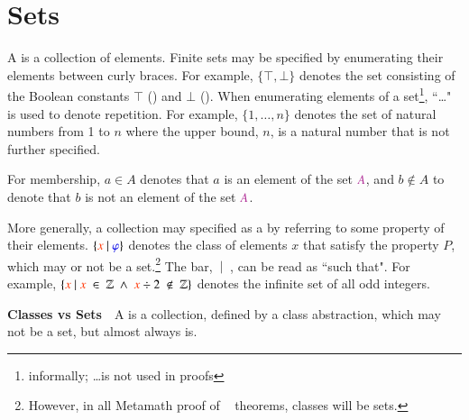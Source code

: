 
%

\section{Sets}\label{sec:sets}

\pn A  is a collection of elements.  Finite sets may be specified by enumerating their elements between curly braces.  For example, \(\{\top, \bot\}\) denotes the set consisting of the Boolean constants $\top$ () and $\bot$ ().  When enumerating elements of a set\footnote{informally; \ldots is not used in proofs}, ``\ldots" is used to denote repetition.  For example, \(\{1, 
\ldots, n\}\) denotes the set of natural numbers from 1 to $n$ where the upper bound, $n$, is a natural number that is not further specified.

\pn For membership, $a\in A$ denotes that $a$ is an element of the set $\mc{A}$, and 
$b\notin A$ to denote that $b$ is not an element of the set $\mc{A}$.  

\pn More generally, a collection may specified as a  by referring to some property of their elements.
\(\{\msc{x}~\vert~ \mw{\varphi}\}\)
denotes the class of elements $x$ that satisfy the property $P$, which may or not be a set.\footnote{However, in all Metamath proof of \lang~ theorems, classes will be sets.}  The bar, $~\vert~$
, can be read as ``such that".
For example,
\(\{\msc{x}~\vert~\msc{x}~\in~\mathbb{Z}~\wedge~\msc{x}\div 2~\notin~\mathbb{Z}\}\)
denotes the infinite set of all odd integers.


\pn \textbf{Classes vs Sets}~~A  is a collection, defined by a class abstraction, which may not be a set, but almost always is.  


